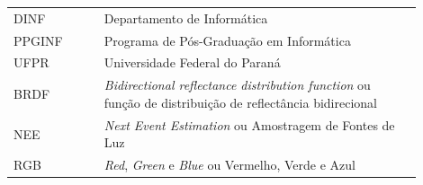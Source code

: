 

\begin{listaacron}

\begin{longtable}[l]{p{0.2\linewidth}p{0.7\linewidth}}
DINF & Departamento de Informática\\
PPGINF & Programa de Pós-Graduação em Informática\\
UFPR & Universidade Federal do Paraná\\
BRDF & \emph{Bidirectional reflectance distribution function} ou função de
distribuição de reflectância bidirecional\\
NEE & \emph{Next Event Estimation} ou Amostragem de Fontes de Luz\\
RGB & \emph{Red}, \emph{Green} e \emph{Blue} ou Vermelho, Verde e Azul\\
\end{longtable}

\end{listaacron}

